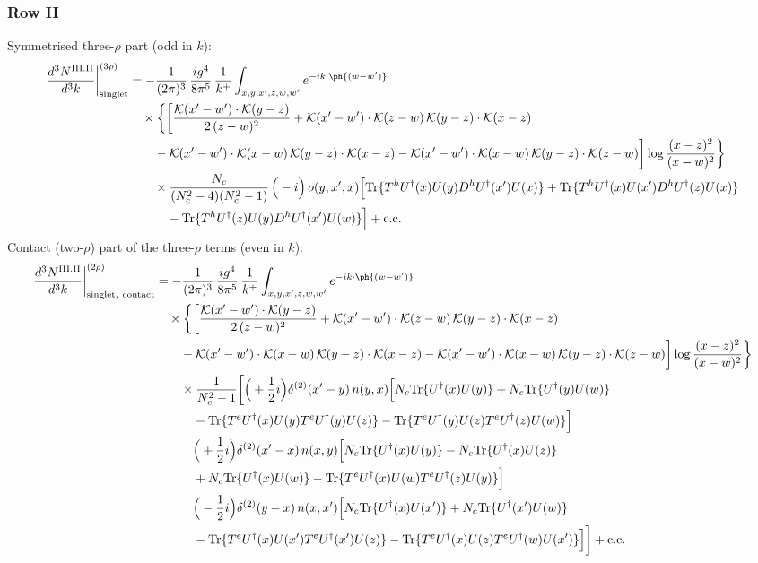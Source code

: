 \subsubsection*{Row II}
Symmetrised three-$\rho$ part (odd in $k$):
\begin{align}
\frac{d^{3}N^{\rm III.II}}{d^{3}k}\bigg|^{(3\rho)}_{\rm singlet}&=-\frac{1}{(2\pi)^{3}}\,\frac{ig^{4}}{8\pi^{5}}\,\frac{1}{k^{+}}\int_{x,y,x',z,w,w'}e^{-ik\cdot\ph{(w-w')}}\notag\\
&\quad\times\bigg\{\bigg[\frac{\mathcal{K}(x'-w')\cdot\mathcal{K}(y-z)}{2\,(z-w)^{2}}+\mathcal{K}(x'-w')\cdot\mathcal{K}(z-w)\,\mathcal{K}(y-z)\cdot\mathcal{K}(x-z)\notag\\
&\qquad-\mathcal{K}(x'-w')\cdot\mathcal{K}(x-w)\,\mathcal{K}(y-z)\cdot\mathcal{K}(x-z)-\mathcal{K}(x'-w')\cdot\mathcal{K}(x-w)\,\mathcal{K}(y-z)\cdot\mathcal{K}(z-w)\bigg]\log\frac{(x-z)^{2}}{(x-w)^{2}}\bigg\}\notag\\
&\qquad\times \frac{N_{c}}{(N_{c}^{2}-4)(N_{c}^{2}-1)}\,\Big(-i\Big)\,o(y,x',x)\Big[{\rm Tr}\{T^{h}U^{\dagger}(x)U(y)D^{h}U^{\dagger}(x')U(x)\}+{\rm Tr}\{T^{h}U^{\dagger}(x)U(x')D^{h}U^{\dagger}(z)U(x)\}\notag\\
&\qquad\quad -{\rm Tr}\{T^{h}U^{\dagger}(z)U(y)D^{h}U^{\dagger}(x')U(w)\}\Big]+{\rm c.c.}\label{eq:E-III.II-3}
\end{align}
Contact (two-$\rho$) part of the three-$\rho$ terms (even in $k$):
\begin{align}
\frac{d^{3}N^{\rm III.II}}{d^{3}k}\bigg|^{(2\rho)}_{\rm singlet,\ contact}&=-\frac{1}{(2\pi)^{3}}\,\frac{ig^{4}}{8\pi^{5}}\,\frac{1}{k^{+}}\int_{x,y,x',z,w,w'}e^{-ik\cdot\ph{(w-w')}}\notag\\
&\quad\times\bigg\{\bigg[\frac{\mathcal{K}(x'-w')\cdot\mathcal{K}(y-z)}{2\,(z-w)^{2}}+\mathcal{K}(x'-w')\cdot\mathcal{K}(z-w)\,\mathcal{K}(y-z)\cdot\mathcal{K}(x-z)\notag\\
&\qquad-\mathcal{K}(x'-w')\cdot\mathcal{K}(x-w)\,\mathcal{K}(y-z)\cdot\mathcal{K}(x-z)-\mathcal{K}(x'-w')\cdot\mathcal{K}(x-w)\,\mathcal{K}(y-z)\cdot\mathcal{K}(z-w)\bigg]\log\frac{(x-z)^{2}}{(x-w)^{2}}\bigg\}\notag\\
&\qquad\times \frac{1}{N_{c}^{2}-1}\bigg[\Big(+\frac{1}{2}i\Big)\delta^{(2)}(x'-y)\,n(y,x)\Big[N_{c}{\rm Tr}\{U^{\dagger}(x)U(y)\}+N_{c}{\rm Tr}\{U^{\dagger}(y)U(w)\}\notag\\
&\qquad\quad -{\rm Tr}\{T^{e}U^{\dagger}(x)U(y)T^{e}U^{\dagger}(y)U(z)\}-{\rm Tr}\{T^{e}U^{\dagger}(y)U(z)T^{e}U^{\dagger}(z)U(w)\}\Big]\notag\\
&\qquad\quad \Big(+\frac{1}{2}i\Big)\delta^{(2)}(x'-x)\,n(x,y)\Big[N_{c}{\rm Tr}\{U^{\dagger}(x)U(y)\}-N_{c}{\rm Tr}\{U^{\dagger}(x)U(z)\}\notag\\
&\qquad\quad +N_{c}{\rm Tr}\{U^{\dagger}(x)U(w)\}-{\rm Tr}\{T^{e}U^{\dagger}(x)U(w)T^{e}U^{\dagger}(z)U(y)\}\Big]\notag\\
&\qquad\quad \Big(-\frac{1}{2}i\Big)\delta^{(2)}(y-x)\,n(x,x')\Big[N_{c}{\rm Tr}\{U^{\dagger}(x)U(x')\}+N_{c}{\rm Tr}\{U^{\dagger}(x')U(w)\}\notag\\
&\qquad\quad -{\rm Tr}\{T^{e}U^{\dagger}(x)U(x')T^{e}U^{\dagger}(x')U(z)\}-{\rm Tr}\{T^{e}U^{\dagger}(x)U(z)T^{e}U^{\dagger}(w)U(x')\}\Big]\bigg]+{\rm c.c.}\label{eq:E-III.II-2}
\end{align}
